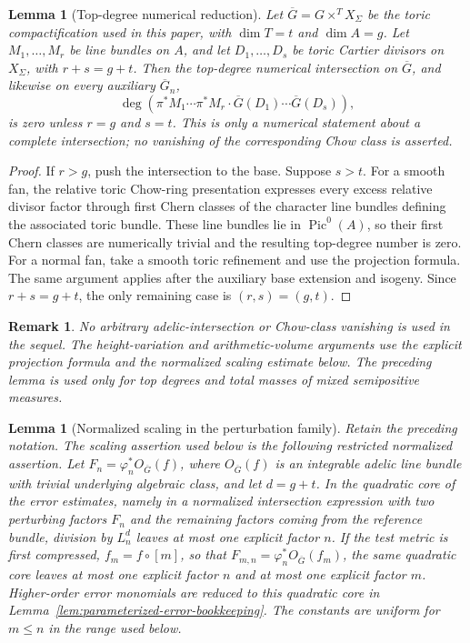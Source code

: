 \documentclass[10pt,a4paper]{amsart}
\theoremstyle{plain}
\newtheorem{lemma}[theorem]{Lemma}
\newtheorem{remark}[theorem]{Remark}
\theoremstyle{plain}
\numberwithin{equation}{section}
\providecommand{\ol}{\overline}
\begin{document}
\begin{lemma}[Top-degree numerical reduction]
	\label{lem:algebraic-dimensional-vanishing}
	Let \(\overline G=G\times^T X_\Sigma\) be the toric compactification used in
	this paper, with \(\dim T=t\) and \(\dim A=g\).  Let \(M_1,\ldots,M_r\) be line
	bundles on \(A\), and let \(D_1,\ldots,D_s\) be toric Cartier divisors on
	\(X_\Sigma\), with \(r+s=g+t\).  Then the top-degree numerical intersection
	on \(\overline G\), and likewise on every auxiliary \(\overline G_n\),
	\[
	\deg\!\left(\pi^*M_1\cdots \pi^*M_r\cdot
	\overline G(D_1)\cdots \overline G(D_s)\right),
	\]
	is zero unless \(r=g\) and \(s=t\).  This is only a numerical statement about
	a complete intersection; no vanishing of the corresponding Chow class is asserted.
\end{lemma}

\begin{proof}
	If \(r>g\), push the intersection to the base.  Suppose \(s>t\).  For a
	smooth fan, the relative toric Chow-ring presentation
	\cite[Theorem~1.2(iii)]{SankaranUma2003} expresses every excess
	relative divisor factor through first Chern classes of the character line
	bundles defining the associated toric bundle.  These line bundles lie in
	\(\operatorname{Pic}^0(A)\), so their first Chern classes are numerically
	trivial and the resulting top-degree number is zero.  For a normal fan, take a
	smooth toric refinement and use the projection formula.  The same argument
	applies after the auxiliary base extension and isogeny.  Since
	\(r+s=g+t\), the only remaining case is \((r,s)=(g,t)\).
\end{proof}

\begin{remark}
	No arbitrary adelic-intersection or Chow-class vanishing is used in the
	sequel.  The height-variation and arithmetic-volume arguments use the explicit
	projection formula and the normalized scaling estimate below.  The preceding
	lemma is used only for top degrees and total masses of mixed semipositive
	measures.
\end{remark}

\begin{lemma}[Normalized scaling in the perturbation family]
	\label{lem:toric-dimensional-scaling}
	Retain the preceding notation.  The scaling assertion used below is the
	following restricted normalized assertion.
	Let \(F_n=\varphi_n^*O_{\ol G}(f)\), where
	\(O_{\ol G}(f)\) is an integrable adelic line bundle with trivial underlying
	algebraic class, and let \(d=g+t\).  In the quadratic core of the error
	estimates, namely in a normalized intersection expression with two perturbing
	factors \(F_n\) and the remaining factors coming from the reference bundle,
	division by \(L_n^d\) leaves at most one explicit factor \(n\).  If the test
	metric is first compressed, \(f_m=f\circ[m]\), so that
	\(F_{m,n}=\varphi_n^*O_{\ol G}(f_m)\), the same quadratic core leaves at most
	one explicit factor \(n\) and at most one explicit factor \(m\).  Higher-order
	error monomials are reduced to this quadratic core in
	Lemma~\ref{lem:parameterized-error-bookkeeping}.  The constants are uniform for
	\(m\le n\) in the range used below.
\end{lemma}
\end{document}
